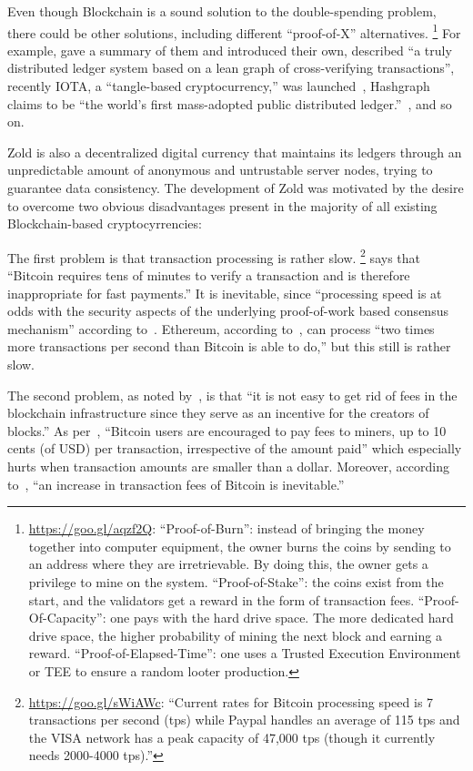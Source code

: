 \documentclass{main}
\begin{document}
Even though Blockchain is a sound solution to the double-spending
problem, there could be other solutions,
including different ``proof-of-X'' alternatives.%
\footnote{%
  \url{https://goo.gl/aqzf2Q}:
  ``Proof-of-Burn'': instead of bringing the money together into computer equipment,
  the owner burns the coins by sending to an address where they are
  irretrievable. By doing this, the owner gets a privilege to
  mine on the system.
  ``Proof-of-Stake'': the coins exist from the start, and
  the validators get a reward in the form of transaction fees.
  ``Proof-Of-Capacity'': one pays with the hard drive space. The more
  dedicated hard drive space, the higher probability of mining
  the next block and earning a reward.
  ``Proof-of-Elapsed-Time'': one uses a Trusted Execution Environment or TEE
  to ensure a random looter production.
}
For example, \textcite{everaere2010} gave
a summary of them and introduced their own,
\textcite{boyen2016} described
``a truly distributed ledger system based on a lean graph of cross-verifying transactions'',
recently IOTA, a ``tangle-based cryptocurrency,'' was launched~\parencite{popov2017},
Hashgraph claims
to be ``the world's first mass-adopted public distributed ledger.''~\parencite{hashgraph},
and so on.

Zold is also a decentralized digital currency that maintains its ledgers
through an unpredictable amount of anonymous and untrustable server nodes, trying to guarantee
data consistency.
The development of Zold was motivated by the desire to overcome
two obvious disadvantages present in the majority of all existing
Blockchain-based cryptocyrrencies:

The first problem is that transaction processing is rather slow.%
\footnote{%
  \url{https://goo.gl/sWiAWc}:
  ``Current rates for Bitcoin processing
  speed is 7 transactions per second (tps) while Paypal handles
  an average of 115 tps and the VISA
  network has a peak capacity of 47,000 tps (though it currently needs 2000-4000 tps).''
}
\textcite{karame2012} says that ``Bitcoin requires tens of minutes to verify a transaction
and is therefore inappropriate for fast payments.''
It is inevitable, since
``processing speed is at odds with the security aspects of the underlying
proof-of-work based consensus mechanism'' according to~\textcite{kiayias2015}.
Ethereum, according to~\textcite{fekkes2018}, can process
``two times more transactions per second than Bitcoin is able to do,''
but this still is rather slow.

The second problem, as noted by~\textcite{popov2017}, is that ``it is not easy to get rid
of fees in the blockchain infrastructure since they serve
as an incentive for the creators of blocks.''
As per~\textcite{moser2015}, ``Bitcoin users are encouraged to
pay fees to miners, up to 10 cents (of USD) per transaction, irrespective of the
amount paid'' which especially hurts when transaction amounts are smaller than a dollar.
Moreover, according to~\textcite{kaskaloglu2014},
``an increase in transaction fees of Bitcoin is inevitable.''
\end{document}
